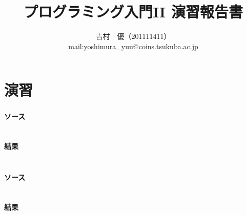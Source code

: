 \documentclass[11pt,a4paper,a4j]{jsarticle}
\title{プログラミング入門II 演習報告書}
\author{吉村　優（201111411）\\
mail:yoshimura\_yuu@coins.tsukuba.ac.jp}
\begin{document}
\maketitle

\part*{演習}
\section{}
\subsection{ソース}
\begin{shadebox}
\begin{verbatim}

\end{verbatim}
\end{shadebox}

\subsection{結果}
\begin{shadebox}
\begin{verbatim}

\end{verbatim}
\end{shadebox}

\clearpage
\section{}
\subsection{ソース}
\begin{shadebox}
\begin{verbatim}

\end{verbatim}
\end{shadebox}

\subsection{結果}
\begin{shadebox}
\begin{verbatim}

\end{verbatim}
\end{shadebox}
\clearpage
\end{document}
